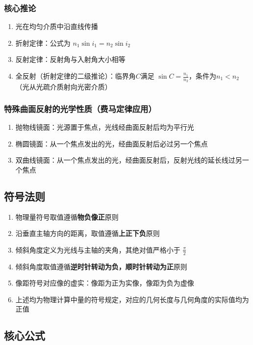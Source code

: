 \documentclass{article}
\begin{document}
	\subsubsection{核心推论}
	\begin{enumerate}[label=\arabic*., leftmargin=2em]
		\item 光在均匀介质中沿直线传播
		\item 折射定律：公式为 $n_1\sin i_1 = n_2\sin i_2$
		\item 反射定律：反射角与入射角大小相等
		\item 全反射（折射定律的二级推论）：临界角$C$满足 $\sin C=\frac{n_1}{n_2}$，条件为$n_1<n_2$（光从光疏介质射向光密介质）
	\end{enumerate}
	
	\subsubsection{特殊曲面反射的光学性质（费马定律应用）}
	\begin{enumerate}[label=\arabic*., leftmargin=2em]
		\item 抛物线镜面：光源置于焦点，光线经曲面反射后均为平行光
		\item 椭圆镜面：从一个焦点发出的光，经曲面反射后必过另一个焦点
		\item 双曲线镜面：从一个焦点发出的光，经曲面反射后，反射光线的延长线过另一个焦点
	\end{enumerate}
	
	\subsection{符号法则}
	\begin{enumerate}[label=\arabic*., leftmargin=2em, itemsep=0.3em]
		\item 物理量符号取值遵循\textbf{物负像正}原则
		\item 沿垂直主轴方向的距离，取值遵循\textbf{上正下负}原则
		\item 倾斜角度定义为光线与主轴的夹角，其绝对值严格小于 $\frac{\pi}{2}$
		\item 倾斜角度取值遵循\textbf{逆时针转动为负，顺时针转动为正}原则
		\item 像距符号对应像的虚实：像距为正为实像，像距为负为虚像
		\item 上述均为物理计算中量的符号规定，对应的几何长度与几何角度的实际值均为正值
	\end{enumerate}
	
	\subsection{核心公式}
\end{document}
